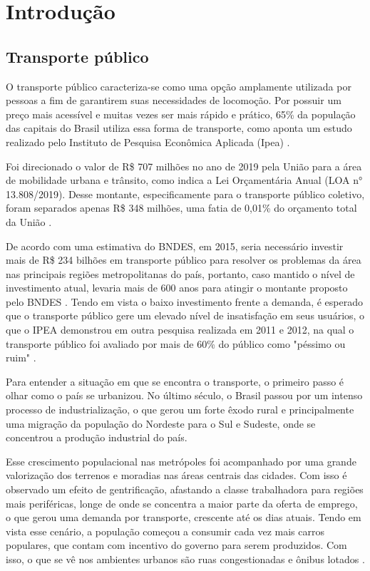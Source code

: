 \chapter{Introdução}
\label{Cap:Intro}


\section{Transporte público}
\indent
\par O transporte público caracteriza-se como uma opção amplamente utilizada por pessoas a fim de garantirem suas necessidades de locomoção. Por possuir um preço mais acessível e muitas vezes ser mais rápido e prático, 65\% da população das capitais do Brasil utiliza essa forma de transporte, como aponta um estudo realizado pelo Instituto de Pesquisa Econômica Aplicada (Ipea) \cite{Peduzzi2011}.
\par Foi direcionado o valor de R\$ 707 milhões no ano de 2019 pela União para a área de mobilidade urbana e trânsito, como indica a Lei Orçamentária Anual (LOA n° 13.808/2019). Desse montante, especificamente para o transporte público coletivo, foram separados apenas R\$ 348 milhões, uma fatia de 0,01\% do orçamento total da União \cite{NTUrbano}.
\par De acordo com uma estimativa do BNDES, em 2015, seria necessário investir mais de R\$ 234 bilhões em transporte público para resolver os problemas da área nas principais regiões metropolitanas do país, portanto, caso mantido o nível de investimento atual, levaria mais de 600 anos para atingir o montante proposto pelo BNDES \cite{Santos2015}. Tendo em vista o baixo investimento frente a demanda, é esperado que o transporte público gere um elevado nível de insatisfação em seus usuários, o que o IPEA demonstrou em outra pesquisa realizada em 2011 e 2012, na qual o transporte público foi avaliado por mais de 60\% do público como "péssimo ou ruim"  \cite{Santos2015}.
\par Para entender a situação em que se encontra o transporte, o primeiro passo é olhar como o país se urbanizou. No último século, o Brasil passou por um intenso processo de industrialização, o que gerou um forte êxodo rural e principalmente uma migração da população do Nordeste para o Sul e Sudeste, onde se concentrou a produção industrial do país.
\par Esse crescimento populacional nas metrópoles foi acompanhado por uma grande valorização dos terrenos e moradias nas áreas centrais das cidades. Com isso é observado um efeito de gentrificação, afastando a classe trabalhadora para regiões mais periféricas, longe de onde se concentra a maior parte da oferta de emprego, o que gerou uma demanda por transporte, crescente até os dias atuais.
Tendo em vista esse cenário, a população começou a consumir cada vez mais carros populares, que contam com incentivo do governo para serem produzidos. Com isso, o que se vê nos ambientes urbanos são ruas congestionadas e ônibus lotados \cite{PenaSD}.

